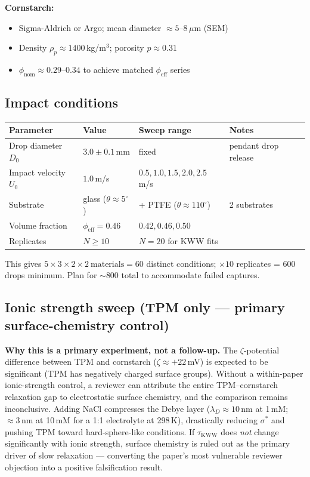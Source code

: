 \documentclass[11pt,letterpaper]{article}
\newcommand{\phieff}{\phi_{\mathrm{eff}}}
\newcommand{\phinom}{\phi_{\mathrm{nom}}}
\newcommand{\taukww}{\tau_{\mathrm{KWW}}}
\newcommand{\sigstar}{\sigma^*}
\begin{document}
\medskip
\noindent\textbf{Cornstarch:}
\begin{itemize}[noitemsep,topsep=3pt]
  \item Sigma-Aldrich or Argo; mean diameter ${\approx}5$--$8\,\mu$m (SEM)
  \item Density $\rho_p \approx 1400$\,kg/m$^3$; porosity $p \approx 0.31$ \cite{HanVanHa2017}
  \item $\phinom \approx 0.29$--$0.34$ to achieve matched $\phieff$ series
\end{itemize}

\subsection{Impact conditions}

\begin{center}
\begin{tabular}{llll}
  \toprule
  Parameter & Value & Sweep range & Notes \\
  \midrule
  Drop diameter $D_0$ & $3.0\pm0.1$\,mm & fixed & pendant drop release \\
  Impact velocity $U_0$ & $1.0$\,m/s & $0.5, 1.0, 1.5, 2.0, 2.5$\,m/s & \\
  Substrate & glass ($\theta\approx5^\circ$) & + PTFE ($\theta\approx110^\circ$) & 2 substrates \\
  Volume fraction & $\phieff = 0.46$ & $0.42, 0.46, 0.50$ & \\
  Replicates & $N \geq 10$ & $N = 20$ for KWW fits & \\
  \bottomrule
\end{tabular}
\end{center}

This gives $5 \times 3 \times 2 \times 2~\text{materials} = 60$ distinct conditions;
$\times 10$ replicates = 600 drops minimum. Plan for ${\sim}800$ total to accommodate
failed captures.

\subsection{Ionic strength sweep (TPM only --- primary surface-chemistry control)}

\begin{gapbox}
\textbf{Why this is a primary experiment, not a follow-up.}
The $\zeta$-potential difference between TPM and cornstarch ($\zeta \approx +22$\,mV)
is expected to be significant (TPM has negatively charged surface groups). Without a
within-paper ionic-strength control, a reviewer can attribute the entire TPM--cornstarch
relaxation gap to electrostatic surface chemistry, and the comparison remains inconclusive.
Adding NaCl compresses the Debye layer ($\lambda_D \approx 10$\,nm at 1\,mM;
${\approx}3$\,nm at 10\,mM for a 1:1 electrolyte at 298\,K), drastically reducing
$\sigstar$ and pushing TPM toward hard-sphere-like conditions. If $\taukww$ does
\emph{not} change significantly with ionic strength, surface chemistry is ruled out as
the primary driver of slow relaxation --- converting the paper's most vulnerable reviewer
objection into a positive falsification result.
\end{gapbox}
\end{document}
